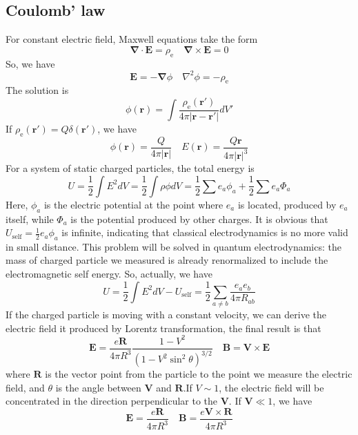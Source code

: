 \subsection{Coulomb' law}
For constant electric field, Maxwell equations take the form 
\[\bm{\nabla} \cdot \bm{E} = \rho_{\mathrm{e}} \quad \bm{\nabla} \times \bm{E} = 0\]
So, we have
\[\bm{E} = -\bm{\nabla} \phi \quad \nabla^2 \phi = -\rho_{\mathrm{e}} \]
The solution is
\[\phi(\bm{r}) = \int  \frac{\rho_{\mathrm{e}}(\bm{r}')}{4\pi|\bm{r}-\bm{r}'|} dV'\]
If $\rho_{\mathrm{e}}(\bm{r}') = Q \delta(\bm{r}')$, we have
\[\phi(\bm{r}) =  \frac{Q}{4\pi|\bm{r}|} \quad E(\bm{r}) = \frac{Q\bm{r}}{4\pi|\bm{r}|^3}\]
For a system of static charged particles, the total energy is
\[U = \frac{1}{2}\int E^2 dV = \frac{1}{2} \int \rho \phi dV = \frac{1}{2} \sum e_a \phi_a + \frac{1}{2}\sum e_a \Phi_a\]
Here, $\phi_a$ is the electric potential at the point where $e_a$ is located, produced by $e_a$ itself, while  $\Phi_a$ is the potential produced by other charges. It is obvious that $U_{\mathrm{self}} = \frac{1}{2} e_a \phi_a$ is infinite, indicating that classical electrodynamics is no more valid in small distance. This problem will be solved in quantum electrodynamics: the mass of charged particle we measured is already renormalized to include the electromagnetic self energy. So, actually, we have
\[U = \frac{1}{2}\int E^2 dV - U_{\mathrm{self}} = \frac{1}{2}\sum_{a \ne b} \frac{e_a e_b}{4\pi R_{ab}}\]
If the charged particle is moving with a constant velocity, we can derive the electric field it produced by Lorentz transformation, the final result is that
\[\bm{E} = \frac{e\bm{R}}{4\pi R^3} \frac{1-V^2}{(1-V^2\sin^2\theta)^{3/2}} \quad \bm{B} = \bm{V} \times \bm{E}\]
where $\bm{R}$ is the vector point from the particle to the point we measure the electric field, and $\theta$ is the angle between $\bm{V}$ and $\bm{R}$.If $V \sim 1$, the electric field will be concentrated in the direction perpendicular to the $\bm{V}$. If $\bm{V} \ll 1$, we have
\[\bm{E} = \frac{e\bm{R}}{4\pi R^3} \quad \bm{B} = \frac{e\bm{V} \times\bm{R}}{4\pi R^3}\]

